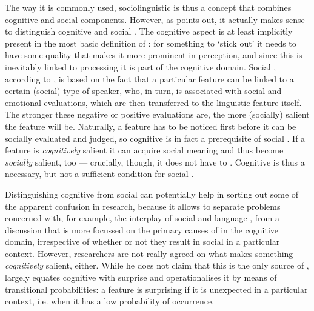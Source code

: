 The way it is commonly used, sociolinguistic  is thus a concept that combines cognitive and social components.
However, as \textcite[cf.][11]{racz2013} points out, it actually makes sense to distinguish cognitive and social .
The cognitive aspect is at least implicitly present in the most basic definition of : for something to `stick out' it needs to have some quality that makes it more prominent in perception, and since this is inevitably linked to processing it is part of the cognitive domain.
Social , according to \textcite[cf.][10]{auer2014}, is based on the fact that a particular feature can be linked to a certain (social) type of speaker, who, in turn, is associated with social and emotional evaluations, which are then transferred to the linguistic feature itself.
The stronger these negative or positive evaluations are, the more (socially) salient the feature will be.
Naturally, a feature has to be noticed first before it can be socially evaluated and judged, so cognitive  is in fact a prerequisite of social .
If a feature is \emph{cognitively} salient it can acquire social meaning and thus become \emph{socially} salient, too --- crucially, though, it does not have to \parencite[cf.][11]{racz2013}.
Cognitive  is thus a necessary, but not a sufficient condition for social .

Distinguishing cognitive from social  can potentially help in sorting out some of the apparent confusion in  research, because it allows to separate problems concerned with, for example, the interplay of social  and language , from a discussion that is more focussed on the primary causes of  in the cognitive domain, irrespective of whether or not they result in social  in a particular context.
However, researchers are not really agreed on what makes something \emph{cognitively} salient, either.
While he does not claim that this is the only source of , \textcite[cf.][9]{racz2013} largely equates cognitive  with surprise and operationalises it by means of transitional probabilities: a feature is surprising if it is unexpected in a particular context, i.e. when it has a low probability of occurrence.

